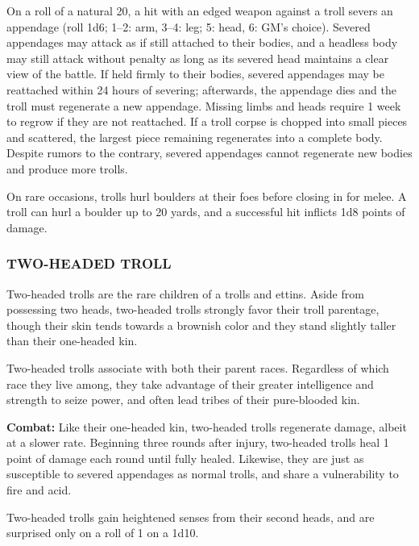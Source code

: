 \begin{multicols}{2}
On a roll of a natural 20, a hit with an edged weapon against a troll severs an appendage (roll 1d6; 1--2: arm, 3--4: leg; 5: head, 6: GM's choice). Severed appendages may attack as if still attached to their bodies, and a headless body may still attack without penalty as long as its severed head maintains a clear view of the battle. If held firmly to their bodies, severed appendages may be reattached within 24 hours of severing; afterwards, the appendage dies and the troll must regenerate a new appendage. Missing limbs and heads require 1 week to regrow if they are not reattached. If a troll corpse is chopped into small pieces and scattered, the largest piece remaining regenerates into a complete body. Despite rumors to the contrary, severed appendages cannot regenerate new bodies and produce more trolls.

On rare occasions, trolls hurl boulders at their foes before closing in for melee. A troll can hurl a boulder up to 20 yards, and a successful hit inflicts 1d8 points of damage.

\subsubsection{TWO-HEADED TROLL}

Two-headed trolls are the rare children of a trolls and ettins. Aside from possessing two heads, two-headed trolls strongly favor their troll parentage, though their skin tends towards a brownish color and they stand slightly taller than their one-headed kin.

Two-headed trolls associate with both their parent races. Regardless of which race they live among, they take advantage of their greater intelligence and strength to seize power, and often lead tribes of their pure-blooded kin.

\textbf{Combat:} Like their one-headed kin, two-headed trolls regenerate damage, albeit at a slower rate. Beginning three rounds after injury, two-headed trolls heal 1 point of damage each round until fully healed. Likewise, they are just as susceptible to severed appendages as normal trolls, and share a vulnerability to fire and acid.

Two-headed trolls gain heightened senses from their second heads, and are surprised only on a roll of 1 on a 1d10.  

\noindent
\begin{minipage}{\columnwidth}

\vspace{1em}


\end{minipage}
\end{multicols}

